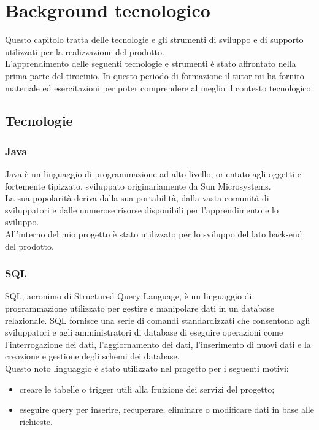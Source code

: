 \hypertarget{tecnologie}{\chapter{Background tecnologico}}
\label{cap:tecnologie}

Questo capitolo tratta delle tecnologie e gli strumenti di sviluppo e di supporto utilizzati per la realizzazione del prodotto.\\ L'apprendimento delle seguenti tecnologie e strumenti è stato affrontato nella prima parte del tirocinio. In questo periodo di formazione il tutor mi ha fornito materiale ed esercitazioni per poter comprendere al meglio il contesto tecnologico.\\

\section{Tecnologie}
\subsection*{Java}
Java è un linguaggio di programmazione ad alto livello, orientato agli oggetti e fortemente tipizzato, sviluppato originariamente da Sun Microsystems.\\
La sua popolarità deriva dalla sua portabilità, dalla vasta comunità di sviluppatori e dalle numerose risorse disponibili per l'apprendimento e lo sviluppo.\\
All'interno del mio progetto è stato utilizzato per lo sviluppo del lato back-end del prodotto. 
\\

\subsection*{SQL}
SQL, acronimo di Structured Query Language, è un linguaggio di programmazione utilizzato per gestire e manipolare dati in un database relazionale. SQL fornisce una serie di comandi standardizzati che consentono agli sviluppatori e agli amministratori di database di eseguire operazioni come l'interrogazione dei dati, l'aggiornamento dei dati, l'inserimento di nuovi dati e la creazione e gestione degli schemi dei database.\\
Questo noto linguaggio è stato utilizzato nel progetto per i seguenti motivi:
\begin{itemize}
\item creare le tabelle o trigger utili alla fruizione dei servizi del progetto;
\item eseguire query per inserire, recuperare, eliminare o modificare dati in base alle richieste.
\end{itemize}


